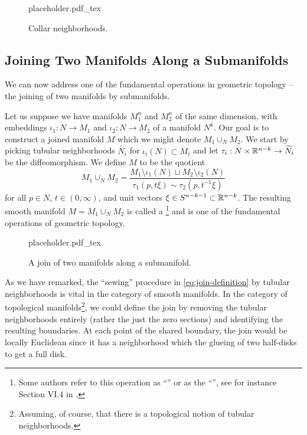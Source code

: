 \begin{figure}[ht]
	\centering
	{placeholder.pdf_tex}
	\caption{Collar neighborhoods.}\label{fig:collar-neighborhoods}
\end{figure}

\subsection{Joining Two Manifolds Along a Submanifolds}

We can now address one of the fundamental operations in geometric topology -- the joining of two manifolds by submanifolds.

Let us suppose we have manifolds $M_1^n$ and $M_2^n$ of the same dimension, with embeddings $\iota_1 : N\to M_1$ and $\iota_2 : N\to M_2$ of a manifold $N^k$. Our goal is to construct a joined manifold $M$ which we might denote $M_1\cup_N M_2$.
We start by picking tubular neighborhoods $\widetilde{N_i}$ for $\iota_i(N)\subset M_i$ and let $\tau_i: N\times \mathbb{R}^{n-k} \to \widetilde{N_i}$ be the diffeomorphism.
We define $M$ to be the quotient
\begin{equation}\label{eq:join-definition}
	M_1\cup_N M_2 = \frac{M_1\setminus \iota_1(N)\sqcup M_2\setminus \iota_2(N)}{\tau_1(p, t\xi) \sim \tau_2(p, t^{-1}\xi)}
\end{equation}
for all $p\in N$, $t\in(0,\infty)$, and unit vectors $\xi\in S^{n-k-1}\subset \mathbb{R}^{n-k}$. The resulting smooth manifold $M=M_1\cup_N M_2$ is called a \footnote{Some authors refer to this operation as ``'' or as the ``'', see for instance Section VI.4 in \cite{kosinski1993differential}.} and is one of the fundamental operations of geometric topology.

\begin{figure}[ht]
	\centering
	{placeholder.pdf_tex}
	\caption{A join of two manifolds along a submanifold.}\label{fig:join-along-submanifold}
\end{figure}

\begin{remark}
	As we have remarked, the ``sewing'' procedure in \cref{eq:join-definition} by tubular neighborhoods is vital in the category of smooth manifolds. In the category of topological manifolds\footnote{Assuming, of course, that there is a topological notion of  tubular neighborhoods.}, we could define the join by removing the tubular neighborhoods entirely (rather the just the zero sections) and identifying the resulting boundaries.
	At each point of the shared boundary, the join would be locally Euclidean since it has a neighborhood which the glueing of two half-disks to get a full disk.
\end{remark}

